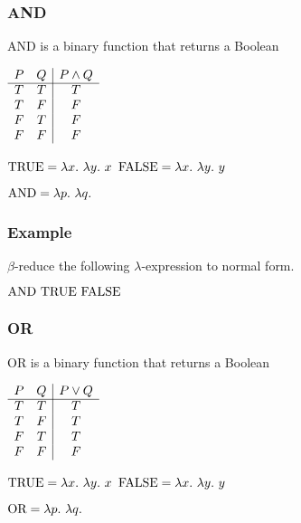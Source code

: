 \documentclass{beamer}
\begin{document}
\begin{frame}
	\frametitle{AND}

	AND is a binary function that returns a Boolean

	\begin{center}
		$\begin{array}{ c c | c }			
			P & Q & P \land Q\\
			\cline{1 - 3}
			T & T & T \\ 
			T & F & F \\ 
			F & T & F \\ 
			F & F & F
		\end{array}$
	\end{center}

	$\TRUE = \lambda x. \ \lambda y. \ x$ \hspace{4cm} $\FALSE = \lambda x. \ \lambda y. \ y$

	\vspace{0.5cm}

	$\AND = \lambda p. \ \lambda q. \  $

	\vspace{2cm}
	
\end{frame}

\begin{frame}
	\frametitle{Example}

	$\beta$-reduce the following $\lambda$-expression to normal form.

	\vspace{0.5cm}

	$\text{AND} \ \text{TRUE} \ \text{FALSE}$

	\vspace{6cm}


\end{frame}

\begin{frame}
	\frametitle{OR}

	OR is a binary function that returns a Boolean

	\begin{center}
		$\begin{array}{ c c | c }			
			P & Q & P \lor Q\\
			\cline{1 - 3}
			T & T & T \\ 
			T & F & T \\ 
			F & T & T \\ 
			F & F & F
		\end{array}$
	\end{center}

	$\TRUE = \lambda x. \ \lambda y. \ x$ \hspace{4cm} $\FALSE = \lambda x. \ \lambda y. \ y$

	\vspace{0.5cm}

	$\OR = \lambda p. \ \lambda q. \  $

	\vspace{2cm}
	
\end{frame}
\end{document}
